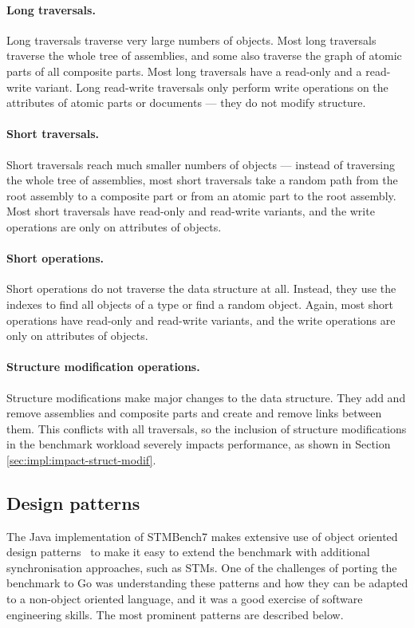 \documentclass[12pt,a4paper,oneside,openright]{report}
\begin{document}
\paragraph{Long traversals.} Long traversals traverse very large
numbers of objects. Most long traversals traverse the whole tree of
assemblies, and some also traverse the graph of atomic parts of all
composite parts. Most long traversals have a read-only and a
read-write variant. Long read-write traversals only perform write
operations on the attributes of atomic parts or documents --- they do
not modify structure.

\paragraph{Short traversals.} Short traversals reach much smaller
numbers of objects --- instead of traversing the whole tree of
assemblies, most short traversals take a random path from the root
assembly to a composite part or from an atomic part to the root
assembly. Most short traversals have read-only and read-write
variants, and the write operations are only on attributes of objects.

\paragraph{Short operations.} Short operations do not traverse the
data structure at all. Instead, they use the indexes to find all
objects of a type or find a random object. Again, most short
operations have read-only and read-write variants, and the write
operations are only on attributes of objects.

\paragraph{Structure modification operations.} Structure modifications
make major changes to the data structure. They add and remove
assemblies and composite parts and create and remove links between
them. This conflicts with all traversals, so the inclusion of
structure modifications in the benchmark workload severely impacts
performance, as shown in Section \ref{sec:impl:impact-struct-modif}.

\subsection{Design patterns}
\label{sec:impl:design-patterns}

The Java implementation of STMBench7 makes extensive use of object
oriented design patterns~\cite{GoF} to make it easy to extend the
benchmark with additional synchronisation approaches, such as
STMs. One of the challenges of porting the benchmark to Go was
understanding these patterns and how they can be adapted to a
non-object oriented language, and it was a good exercise of software
engineering skills. The most prominent patterns are described below.
\end{document}
